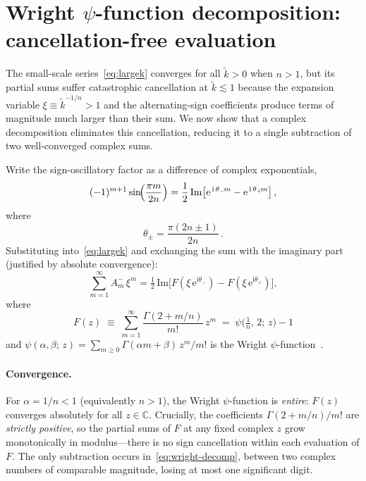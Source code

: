 \documentclass[aps,prd,onecolumn]{revtex4-2}
\newcommand{\kt}{\tilde{k}}          %
\begin{document}
\section{Wright $\psi$-function decomposition: cancellation-free evaluation}
\label{sec:wright}

The small-scale series~\eqref{eq:largek} converges for all $\kt>0$ when
$n>1$, but its partial sums suffer catastrophic cancellation at
$\kt\lesssim1$ because the expansion variable $\xi\equiv\kt^{-1/n}>1$ and
the alternating-sign coefficients produce terms of magnitude much larger
than their sum.  We now show that a complex decomposition eliminates this
cancellation, reducing it to a single subtraction of two well-converged
complex sums.

Write the sign-oscillatory factor as a difference of complex exponentials,
\begin{equation}
(-1)^{m+1}\sin\!\Bigl(\frac{\pi m}{2n}\Bigr)
= \frac{1}{2}\,\mathrm{Im}\!\left[
  \mathrm{e}^{\,\mathrm{i}\,\theta_-\!m}
  - \mathrm{e}^{\,\mathrm{i}\,\theta_+\!m}\right],
\label{eq:sign-decomp}
\end{equation}
where
\begin{equation}
\theta_\pm = \frac{\pi(2n\pm1)}{2n}\,.
\label{eq:theta-pm}
\end{equation}
Substituting into~\eqref{eq:largek} and exchanging the sum with the
imaginary part (justified by absolute convergence):
\begin{equation}
\boxed{\;
\sum_{m=1}^{\infty}A_m^{-}\,\xi^{m}
= \tfrac{1}{2}\,\mathrm{Im}\!\bigl[
  F(\xi\,\mathrm{e}^{\mathrm{i}\theta_-})
  - F(\xi\,\mathrm{e}^{\mathrm{i}\theta_+})\bigr],\;}
\label{eq:wright-decomp}
\end{equation}
where
\begin{equation}
F(z) \;\equiv\; \sum_{m=1}^{\infty}
\frac{\Gamma(2+m/n)}{m!}\,z^{m}
\;=\; \psi\!\bigl(\tfrac{1}{n},\,2;\,z\bigr) - 1
\label{eq:wright-F}
\end{equation}
and $\psi(\alpha,\beta;\,z)=\sum_{m\ge0}\Gamma(\alpha m+\beta)\,z^m/m!$ is
the Wright $\psi$-function~\cite{Wright1935,DLMF}.

\paragraph{Convergence.}
For $\alpha=1/n<1$ (equivalently $n>1$), the Wright $\psi$-function is
\emph{entire}: $F(z)$ converges absolutely for all $z\in\mathbb{C}$.
Crucially, the coefficients $\Gamma(2+m/n)/m!$ are \emph{strictly positive},
so the partial sums of $F$ at any fixed complex $z$ grow monotonically in
modulus---there is no sign cancellation within each evaluation of $F$.
The only subtraction occurs in~\eqref{eq:wright-decomp}, between two
complex numbers of comparable magnitude, losing at most one significant
digit.
\end{document}
